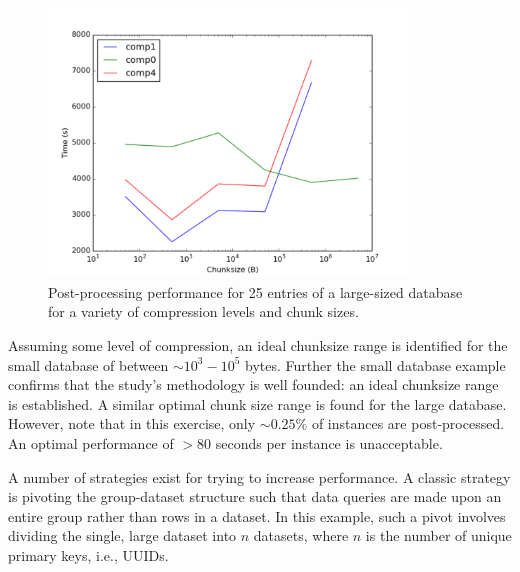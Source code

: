 \begin{figure}
  \begin{center}
    \includegraphics[width=0.85\textwidth]{./backmatter/figs/large_all.pdf}
    \caption{
      \label{fig:large_db}
      Post-processing performance for 25 entries of a large-sized database for a
      variety of compression levels and chunk sizes.}
  \end{center}
\end{figure}

Assuming some level of compression, an ideal chunksize range is identified for
the small database of between $\sim 10^3 - 10^5$ bytes. Further the small
database example confirms that the study's methodology is well founded: an ideal
chunksize range is established. A similar optimal chunk size range is found for
the large database. However, note that in this exercise, only $\sim 0.25\%$ of
instances are post-processed. An optimal performance of $> 80$ seconds per
instance is unacceptable.

A number of strategies exist for trying to increase performance. A classic
strategy is pivoting the group-dataset structure such that data queries are made
upon an entire group rather than rows in a dataset. In this example, such a
pivot involves dividing the single, large dataset into $n$ datasets, where $n$
is the number of unique primary keys, i.e., UUIDs.

